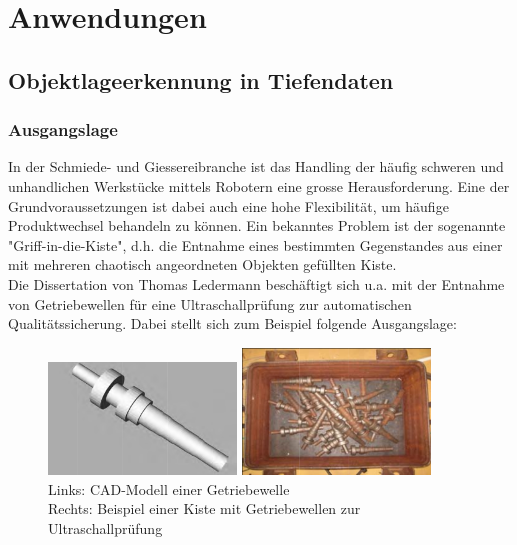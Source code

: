 \section{Anwendungen}

\subsection{Objektlageerkennung in Tiefendaten} 

\subsubsection{Ausgangslage}
In der Schmiede- und Giessereibranche ist das Handling der häufig schweren und unhandlichen Werkstücke mittels Robotern eine grosse Herausforderung. Eine der Grundvoraussetzungen ist dabei auch eine hohe Flexibilität, um häufige Produktwechsel behandeln zu können. Ein bekanntes Problem ist der sogenannte "Griff-in-die-Kiste", d.h. die Entnahme eines bestimmten Gegenstandes aus einer mit mehreren chaotisch angeordneten Objekten gefüllten Kiste. \\

Die Dissertation \cite{Diss-Ledermann} von Thomas Ledermann beschäftigt sich u.a. mit der Entnahme von Getriebewellen für eine Ultraschallprüfung zur automatischen Qualitätssicherung. Dabei stellt sich zum Beispiel folgende Ausgangslage: \\

\begin{figure}[htbp]
	\centering
	\begin{minipage}{6cm}
		\includegraphics[width=5cm]{images/welle-cad}
	\end{minipage}
	\begin{minipage}{6cm}
		\includegraphics[width=5cm]{images/welle-kiste}
	\end{minipage}
	\caption{	Links: CAD-Modell einer Getriebewelle \\
				Rechts: Beispiel einer Kiste mit Getriebewellen zur Ultraschallprüfung}
	\label{Fig-Getriebewelle}
\end{figure}

